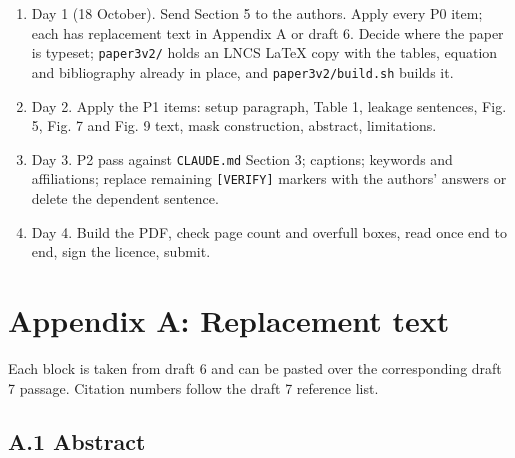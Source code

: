 \documentclass[
  11pt,
]{article}
\providecommand{\tightlist}{%
  \setlength{\itemsep}{0pt}\setlength{\parskip}{0pt}}
\begin{document}
\begin{enumerate}
\def\labelenumi{\arabic{enumi}.}
\tightlist
\item
  Day 1 (18 October). Send Section 5 to the authors. Apply every P0
  item; each has replacement text in Appendix A or draft 6. Decide where
  the paper is typeset; \texttt{paper3v2/} holds an LNCS LaTeX copy with
  the tables, equation and bibliography already in place, and
  \texttt{paper3v2/build.sh} builds it.
\item
  Day 2. Apply the P1 items: setup paragraph, Table 1, leakage
  sentences, Fig. 5, Fig. 7 and Fig. 9 text, mask construction,
  abstract, limitations.
\item
  Day 3. P2 pass against \texttt{CLAUDE.md} Section 3; captions;
  keywords and affiliations; replace remaining \texttt{{[}VERIFY{]}}
  markers with the authors' answers or delete the dependent sentence.
\item
  Day 4. Build the PDF, check page count and overfull boxes, read once
  end to end, sign the licence, submit.
\end{enumerate}

\section{Appendix A: Replacement
text}\label{appendix-a-replacement-text}

Each block is taken from draft 6 and can be pasted over the
corresponding draft 7 passage. Citation numbers follow the draft 7
reference list.

\subsection{A.1 Abstract}\label{a.1-abstract}
\end{document}
